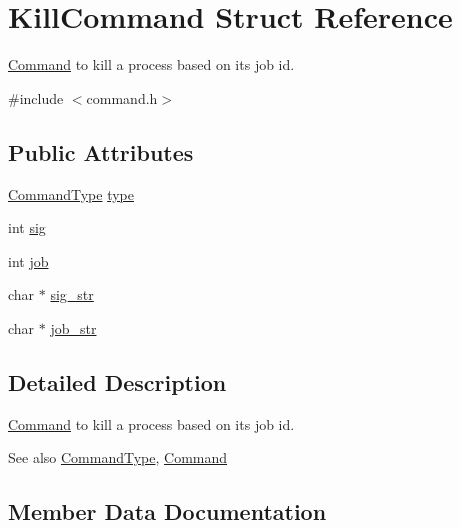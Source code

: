\hypertarget{structKillCommand}{}\section{Kill\+Command Struct Reference}
\label{structKillCommand}


\hyperlink{unionCommand}{Command} to kill a process based on it\textquotesingle{}s job id.  




{\ttfamily \#include $<$command.\+h$>$}

\subsection*{Public Attributes}
\begin{DoxyCompactItemize}
\item 
\hyperlink{command_8h_a21e038f5b8958e203d28bc4f18472352}{Command\+Type} \hyperlink{structKillCommand_a9cd678bc0659f74340e3fca28766bcda}{type}
\item 
int \hyperlink{structKillCommand_a20f5367bbec80a936189c57b1f9db351}{sig}
\item 
int \hyperlink{structKillCommand_abd4689c605a3dfe202a1779f0d1191ae}{job}
\item 
char $\ast$ \hyperlink{structKillCommand_a879a36b90427ec640bef5c92a6c9c24e}{sig\+\_\+str}
\item 
char $\ast$ \hyperlink{structKillCommand_a174a9714a69550b0bbf611e59bfbf332}{job\+\_\+str}
\end{DoxyCompactItemize}


\subsection{Detailed Description}
\hyperlink{unionCommand}{Command} to kill a process based on it\textquotesingle{}s job id. 

\begin{DoxySeeAlso}{See also}
\hyperlink{command_8h_aa8311e0de296df9816965be35c31d925}{Command\+Type}, \hyperlink{unionCommand}{Command} 
\end{DoxySeeAlso}


\subsection{Member Data Documentation}
\mbox{\label{structKillCommand_abd4689c605a3dfe202a1779f0d1191ae}} 
